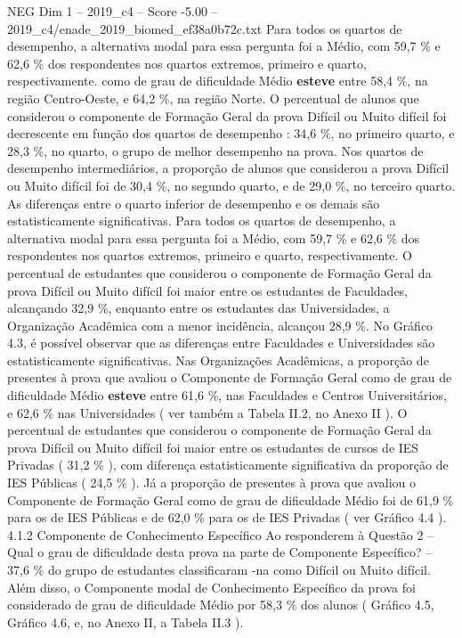 \begin{textsample}{NEG Dim 1 – 2019\_c4 – Score -5.00 – 2019\_c4/enade\_2019\_biomed\_ef38a0b72c.txt}
Para todos os quartos de desempenho, a alternativa modal para essa pergunta foi a Médio, com 59,7 \% e 62,6 \% dos respondentes nos quartos extremos, primeiro e quarto, respectivamente. como de grau de dificuldade Médio \textbf{esteve} entre 58,4 \%, na região Centro-Oeste, e 64,2 \%, na região Norte.
O percentual de alunos que considerou o componente de Formação Geral da prova Difícil ou Muito difícil foi decrescente em função dos quartos de desempenho : 34,6 \%, no primeiro quarto, e 28,3 \%, no quarto, o grupo de melhor desempenho na prova.
Nos quartos de desempenho intermediários, a proporção de alunos que considerou a prova Difícil ou Muito difícil foi de 30,4 \%, no segundo quarto, e de 29,0 \%, no terceiro quarto.
As diferenças entre o quarto inferior de desempenho e os demais são estatisticamente significativas.
Para todos os quartos de desempenho, a alternativa modal para essa pergunta foi a Médio, com 59,7 \% e 62,6 \% dos respondentes nos quartos extremos, primeiro e quarto, respectivamente.
O percentual de estudantes que considerou o componente de Formação Geral da prova Difícil ou Muito difícil foi maior entre os estudantes de Faculdades, alcançando 32,9 \%, enquanto entre os estudantes das Universidades, a Organização Acadêmica com a menor incidência, alcançou 28,9 \%.
No Gráfico 4.3, é possível observar que as diferenças entre Faculdades e Universidades são estatisticamente significativas.
Nas Organizações Acadêmicas, a proporção de presentes à prova que avaliou o Componente de Formação Geral como de grau de dificuldade Médio \textbf{esteve} entre 61,6 \%, nas Faculdades e Centros Universitários, e 62,6 \% nas Universidades ( ver também a Tabela II.2, no Anexo II ).
O percentual de estudantes que considerou o componente de Formação Geral da prova Difícil ou Muito difícil foi maior entre os estudantes de cursos de IES Privadas ( 31,2 \% ), com diferença estatisticamente significativa da proporção de IES Públicas ( 24,5 \% ).
Já a proporção de presentes à prova que avaliou o Componente de Formação Geral como de grau de dificuldade Médio foi de 61,9 \% para os de IES Públicas e de 62,0 \% para os de IES Privadas ( ver Gráfico 4.4 ). 4.1.2 Componente de Conhecimento Específico Ao responderem à Questão 2 – Qual o grau de dificuldade desta prova na parte de Componente Específico? – 37,6 \% do grupo de estudantes classificaram -na como Difícil ou Muito difícil.
Além disso, o Componente modal de Conhecimento Específico da prova foi considerado de grau de dificuldade Médio por 58,3 \% dos alunos ( Gráfico 4.5, Gráfico 4.6, e, no Anexo II, a Tabela II.3 ).

\end{textsample}
